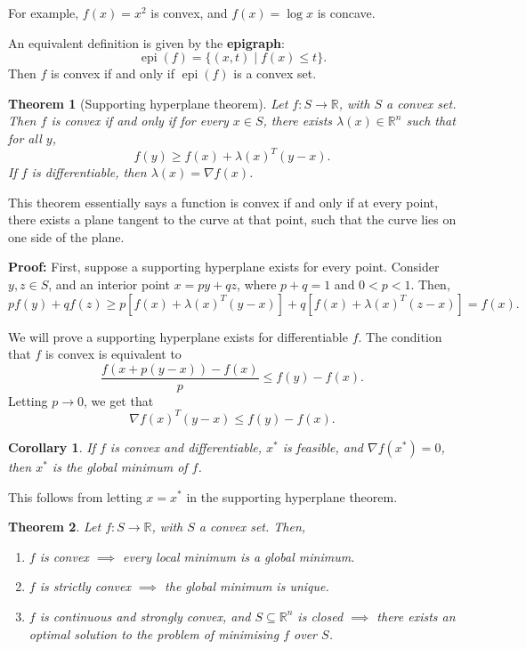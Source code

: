 \documentclass[12pt]{article}
\DeclareMathOperator{\epi}{epi}
\newtheorem{theorem}{Theorem}[section]
\newtheorem{corollary}{Corollary}[section]
\theoremstyle{definition}
\theoremstyle{remark}
\begin{document}
For example, $f(x) = x^2$ is convex, and $f(x) = \log x$ is concave.

An equivalent definition is given by the \textbf{epigraph}:
\[
	\epi(f) = \{(x, t) \mid f(x) \leq t\}
.\]
Then $f$ is convex if and only if $\epi(f)$ is a convex set.

\begin{theorem}[Supporting hyperplane theorem]
\label{thm:SHT}
	Let $f : S \to \mathbb{R}$, with $S$ a convex set. Then $f$ is convex if and only if for every $x \in S$, there exists $\lambda(x) \in \mathbb{R}^{n}$ such that for all $y$,
	\[
		f(y) \geq f(x) + \lambda(x)^{T} (y - x)
	.\]
	If $f$ is differentiable, then $\lambda(x) = \nabla f(x)$.
\end{theorem}

This theorem essentially says a function is convex if and only if at every point, there exists a plane tangent to the curve at that point, such that the curve lies on one side of the plane.

\begin{adjustbox}{minipage = \columnwidth - 25.5pt, margin=1em, frame=1pt, margin=0em}
\textbf{Proof:} First, suppose a supporting hyperplane exists for every point. Consider $y, z \in S$, and an interior point $x = py + qz$, where $p + q = 1$ and $0 < p < 1$. Then,
\[
	pf(y) + qf(z) \geq p[f(x) + \lambda(x)^{T}(y - x)] + q[f(x) + \lambda(x)^{T}(z - x)] = f(x)
.\]
\end{adjustbox}
\newpage
\begin{adjustbox}{minipage = \columnwidth - 25.5pt, margin=1em, frame=1pt, margin=0em}
We will prove a supporting hyperplane exists for differentiable $f$. The condition that $f$ is convex is equivalent to
\[
	\frac{f(x + p(y - x)) - f(x)}{p} \leq f(y) - f(x)
.\]
Letting $p \to 0$, we get that
\[
	\nabla f(x)^{T}(y - x) \leq f(y) - f(x)
.\]
\end{adjustbox}

\begin{corollary}
	If $f$ is convex and differentiable, $x^{\ast}$ is feasible, and $\nabla f(x^{\ast}) = 0$, then $x^{\ast}$ is the global minimum of $f$.
\end{corollary}
This follows from letting $x = x^{\ast}$ in the supporting hyperplane theorem.

\begin{theorem}
	Let $f : S \to \mathbb{R}$, with $S$ a convex set. Then,
	\begin{enumerate}[\normalfont(a)]
		\item $f$ is convex $\implies$ every local minimum is a global minimum.
		\item $f$ is strictly convex $\implies$ the global minimum is unique.
		\item $f$ is continuous and strongly convex, and $S \subseteq \mathbb{R}^{n}$ is closed $\implies$ there exists an optimal solution to the problem of minimising $f$ over $S$.
	\end{enumerate}
\end{theorem}
\end{document}
